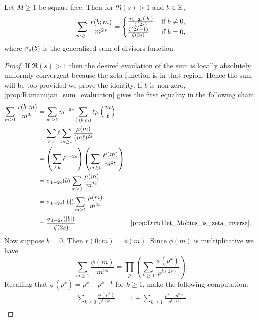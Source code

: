       \begin{lemma}\label{lem:Ramanujan_zeta_relation}
        Let $M \ge 1$ be square-free. Then for $\Re(s) > 1$ and $b \in \mathbb{Z}$,
        \[
          \sum_{m \ge 1}\frac{r(b;m)}{m^{2s}} = \begin{cases} \frac{\sigma_{1-2s}(|b|)}{\zeta(2s)} & \text{if $b \neq 0$}, \\ \frac{\zeta(2s-1)}{\zeta(2s)} & \text{if $b = 0$}, \end{cases}
        \]
        where $\sigma_{s}(b)$ is the generalized sum of divisors function.
      \end{lemma}
      \begin{proof}
        If $\Re(s) > 1$ then the desired evaulation of the sum is locally absolutely uniformly convergent because the zeta function is in that region. Hence the sum will be too provided we prove the identity. If $b$ is non-zero, \cref{prop:Ramanujan_sum_evaluation} gives the first equality in the following chain:
        \begin{align*}
          \sum_{m \ge 1}\frac{r(b;m)}{m^{2s}} &= \sum_{m \ge 1}m^{-2s}\sum_{\ell \mid (b,m)}\ell\mu\left(\frac{m}{\ell}\right) \\
          &= \sum_{\ell \mid b}\ell\sum_{m \ge 1}\frac{\mu(m)}{(m\ell)^{2s}} \\
          &= \left(\sum_{\ell \mid b}\ell^{1-2s}\right)\left(\sum_{m \ge 1}\frac{\mu(m)}{m^{2s}}\right) \\
          &= \s_{1-2s}(b)\sum_{m \ge 1}\frac{\mu(m)}{m^{2s}} \\
          &= \s_{1-2s}(|b|)\sum_{m \ge 1}\frac{\mu(m)}{m^{2s}} \\
          &= \frac{\s_{1-2s}(|b|)}{\z(2s)} && \text{\cref{prop:Dirichlet_Mobius_is_zeta_inverse}}.
        \end{align*}
        Now suppose $b = 0$. Then $r(0;m) = \phi(m)$. Since $\phi(m)$ is multiplicative we have
        \begin{equation}\label{equ:Ramanujan_zeta_relation_1}
          \sum_{m \ge 1}\frac{\phi(m)}{m^{2s}} = \prod_{p}\left(\sum_{k \ge 0}\frac{\phi(p^{k})}{p^{k(2s)}}\right).
        \end{equation}
        Recalling that $\phi(p^{k}) = p^{k}-p^{k-1}$ for $k \ge 1$, make the following computation:
        \begin{equation}\label{equ:Ramanujan_zeta_relation_2}
          \begin{aligned}
            \sum_{k \ge 0}\frac{\phi(p^{k})}{p^{k(2s)}} &= 1+\sum_{k \ge 1}\frac{p^{k}-p^{k-1}}{p^{k(2s)}} \\

\end{aligned}
\end{equation}
\end{proof}
